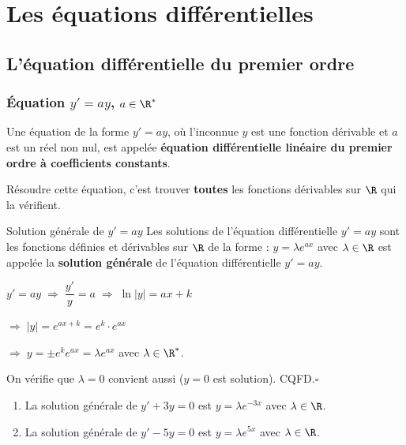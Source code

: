 \let\cleardoublepage\clearpage
\chapter{Les \'equations diff\'erentielles}

\section{L'\'equation diff\'erentielle du premier ordre}

\subsection{\'Equation $y'=ay$, $a\in\R^*$}

\begin{Definition}
Une \'equation de la forme $y'=ay$, o\`u l'inconnue $y$ est une fonction d\'erivable
et $a$ est un r\'eel non nul, est appel\'ee \textbf{\'equation diff\'erentielle lin\'eaire
du premier ordre \`a coefficients constants}.

R\'esoudre cette \'equation, c'est trouver \textbf{toutes} les fonctions d\'erivables sur $\R$
qui la v\'erifient.
\end{Definition}

\begin{Propriete}[]{Solution g\'en\'erale de $y'=ay$}
Les solutions de l'\'equation diff\'erentielle $y'=ay$ sont les fonctions
d\'efinies et d\'erivables sur $\R$ de la forme :
$y=\lambda e^{ax}$ avec $\lambda\in\R$ est appel\'ee la \textbf{solution g\'en\'erale}
de l'\'equation diff\'erentielle $y'=ay$.
\end{Propriete}

\begin{Demo}
$y'=ay \;\Rightarrow\; \dfrac{y'}{y}=a \;\Rightarrow\; \ln|y|=ax+k$

$\Rightarrow\; |y|=e^{ax+k}=e^k\cdot e^{ax}$

$\Rightarrow\; y=\pm e^k e^{ax}=\lambda e^{ax}$ avec $\lambda\in\R^*$.

On v\'erifie que $\lambda=0$ convient aussi ($y=0$ est solution). CQFD.\hfill$\square$
\end{Demo}

\Exemples
\begin{enumerate}
  \item La solution g\'en\'erale de $y'+3y=0$ est $y=\lambda e^{-3x}$ avec $\lambda\in\R$.
  \item La solution g\'en\'erale de $y'-5y=0$ est $y=\lambda e^{5x}$ avec $\lambda\in\R$.
\end{enumerate}

